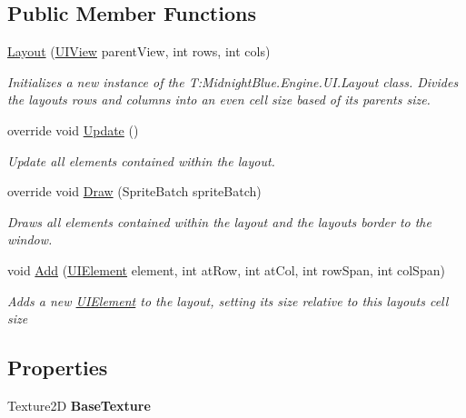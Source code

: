 \subsection*{Public Member Functions}
\begin{DoxyCompactItemize}
\item 
\hyperlink{class_midnight_blue_1_1_engine_1_1_u_i_1_1_layout_a37ad7b392b6ebab35c7bf2797b0f459a}{Layout} (\hyperlink{class_midnight_blue_1_1_engine_1_1_u_i_1_1_u_i_view}{U\+I\+View} parent\+View, int rows, int cols)
\begin{DoxyCompactList}\small\item\em Initializes a new instance of the T\+:\+Midnight\+Blue.\+Engine.\+U\+I.\+Layout class. Divides the layouts rows and columns into an even cell size based of its parents size. \end{DoxyCompactList}\item 
override void \hyperlink{class_midnight_blue_1_1_engine_1_1_u_i_1_1_layout_a7f7c86af6689c117db5d106aa9fadcf2}{Update} ()
\begin{DoxyCompactList}\small\item\em Update all elements contained within the layout. \end{DoxyCompactList}\item 
override void \hyperlink{class_midnight_blue_1_1_engine_1_1_u_i_1_1_layout_a79151b83463cab0debd506caf8e46bff}{Draw} (Sprite\+Batch sprite\+Batch)
\begin{DoxyCompactList}\small\item\em Draws all elements contained within the layout and the layouts border to the window. \end{DoxyCompactList}\item 
void \hyperlink{class_midnight_blue_1_1_engine_1_1_u_i_1_1_layout_afa3293d67ab980b6b19501fa965ae38f}{Add} (\hyperlink{class_midnight_blue_1_1_engine_1_1_u_i_1_1_u_i_element}{U\+I\+Element} element, int at\+Row, int at\+Col, int row\+Span, int col\+Span)
\begin{DoxyCompactList}\small\item\em Adds a new \hyperlink{class_midnight_blue_1_1_engine_1_1_u_i_1_1_u_i_element}{U\+I\+Element} to the layout, setting its size relative to this layouts cell size \end{DoxyCompactList}\end{DoxyCompactItemize}
\subsection*{Properties}
\begin{DoxyCompactItemize}
\item 
\hypertarget{class_midnight_blue_1_1_engine_1_1_u_i_1_1_layout_a13f5ab7c14ab100538b2261bc7330cd9}{}\label{class_midnight_blue_1_1_engine_1_1_u_i_1_1_layout_a13f5ab7c14ab100538b2261bc7330cd9} 
Texture2D {\bfseries Base\+Texture}
\end{DoxyCompactItemize}
